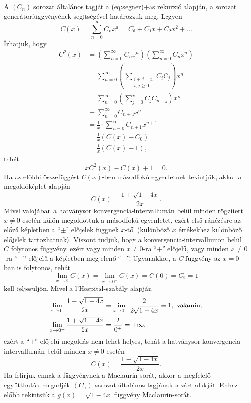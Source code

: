 \begin{solution}
A $(C_{n})$ sorozat általános tagját a \told\aref({eq:segner})+as{}
rekurzió alapján, a sorozat generátorfüggvényének segítségével határozzuk
meg. Legyen 
\[
C(x)=\sum_{n=0}^{\infty}C_{n}x^{n}=C_{0}+C_{1}x+C_{2}x^{2}+\ldots
\]
Írhatjuk, hogy 
\begin{align*}
C^{2}(x) & =\left(\sum_{n=0}^{\infty}C_{n}x^{n}\right)\left(\sum_{n=0}^{\infty}C_{n}x^{n}\right)\\
 & =\sum_{n=0}^{\infty}\left(\sum_{\substack{i+j=n\\
i,j\geq0
}
}C_{i}C_{j}\right)x^{n}\\
 & =\sum_{n=0}^{\infty}\left(\sum_{j=0}^{n}C_{j}C_{n-j}\right)x^{n}\\
 & =\sum_{n=0}^{\infty}C_{n+1}x^{n}\\
 & =\frac{1}{x}\cdot\sum_{n=0}^{\infty}C_{n+1}x^{n+1}\\
 & =\frac{1}{x}\left(C(x)-C_{0}\right)\\
 & =\frac{1}{x}\left(C(x)-1\right),
\end{align*}
tehát 
\[
xC^{2}(x)-C(x)+1=0.
\]
Ha az előbbi összefüggést $C(x)$-ben másodfokú egyenletnek tekintjük,
akkor a megoldóképlet alapján 
\[
C(x)=\frac{1\pm\sqrt{1-4x}}{2x}.
\]
Mivel valójában a hatványsor konvergencia-intervallumán belül minden
rögzített $x\ne0$ esetén külön megoldottuk a másodfokú egyenletet,
ezért első ránézésre az előző képletben a ``$\pm$'' előjelek függnek
$x$-től (különböző $x$ értékekhez különböző előjelek tartozhatnak).
Viszont tudjuk, hogy a konvergencia-intervallumon belül $C$ folytonos
függvény, ezért vagy minden $x\ne0$-ra ``$+$'' előjelű, vagy minden
$x\ne0$-ra ``$-$'' előjelű a képletben megjelenő ``$\pm$''.
Ugyanakkor, a $C$ függvény az $x=0$-ban is folytonos, tehát 
\[
\lim\limits_{x\to0}C(x)=\lim\limits_{x\to0^{+}}C(x)=C(0)=C_{0}=1
\]
kell teljesüljön. Mivel a l'Hospital-szabály alapján 
\begin{align*}
\lim\limits_{x\to0^{+}}\frac{1-\sqrt{1-4x}}{2x} & =\lim\limits_{x\to0^{+}}\frac{2}{2\sqrt{1-4x}}=1,\textnormal{ valamint}\\
\lim\limits_{x\to0^{+}}\frac{1+\sqrt{1-4x}}{2x} & =\frac{2}{0^{+}}=+\infty,
\end{align*}
ezért a ``$+$'' előjelű megoldás nem lehet helyes, tehát a hatványsor
konvergencia-intervallumán belül minden $x\ne0$ esetén 
\[
C(x)=\frac{1-\sqrt{1-4x}}{2x}.
\]
Ha felírjuk ennek a függvénynek a Maclaurin-sorát, akkor a megfelelő
együtthatók megadják $(C_{n})$ sorozat általános tagjának a zárt
alakját. Ehhez előbb tekintsük a $g(x)=\sqrt{1-4x}$ függvény Maclaurin-sorát.

\end{solution}
